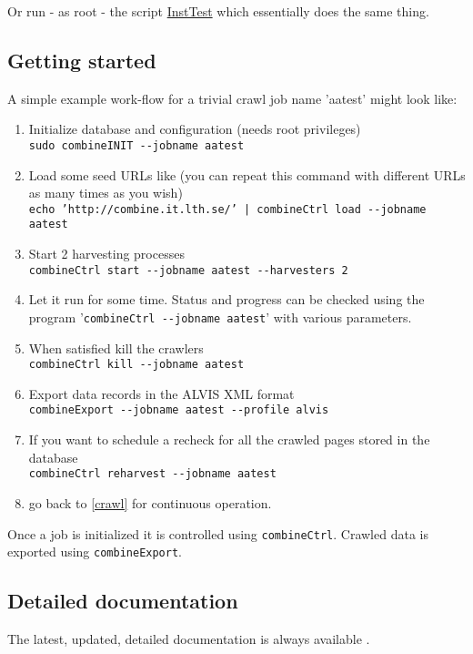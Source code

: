 Or run - as root - the script
\hyperref{{\tt ./doc/InstallationTest.pl}}{{\tt ./doc/InstallationTest.pl} (see Appendix }{)}{InstTest}
which essentially does the same thing.


\subsection{Getting started}
\label{gettingstarted}
A simple example work-flow for a trivial crawl job name 'aatest' might look like:

\begin{enumerate}
\item    Initialize database and configuration (needs root privileges)\\
{\tt  sudo combineINIT \verb+--+jobname aatest}
\item \label{load} Load some seed URLs like (you can repeat this command with different URLs as many times as you wish)\\
{\tt  echo 'http://combine.it.lth.se/' | combineCtrl  load \verb+--+jobname aatest}
\item \label{crawl}   Start 2 harvesting processes\\
{\tt  combineCtrl  start \verb+--+jobname aatest \verb+--+harvesters 2}

\item Let it run for some time. Status and progress can be checked using
the program '{\tt combineCtrl \verb+--+jobname aatest}'
with various parameters.

\item    When satisfied kill the crawlers\\
{\tt  combineCtrl kill \verb+--+jobname aatest}
\item    Export data records in the ALVIS XML format\\
{\tt  combineExport \verb+--+jobname aatest \verb+--+profile alvis}

\item If you want to schedule a recheck for all the crawled pages stored in the database\\
{\tt combineCtrl reharvest \verb+--+jobname aatest}
\item go back to \ref{crawl} for continuous operation.
\end{enumerate}

Once a job is initialized it is controlled using
{\tt combineCtrl}. Crawled data is exported using {\tt combineExport}.

\subsection{Detailed documentation}
The latest, updated, detailed documentation is always available
.

